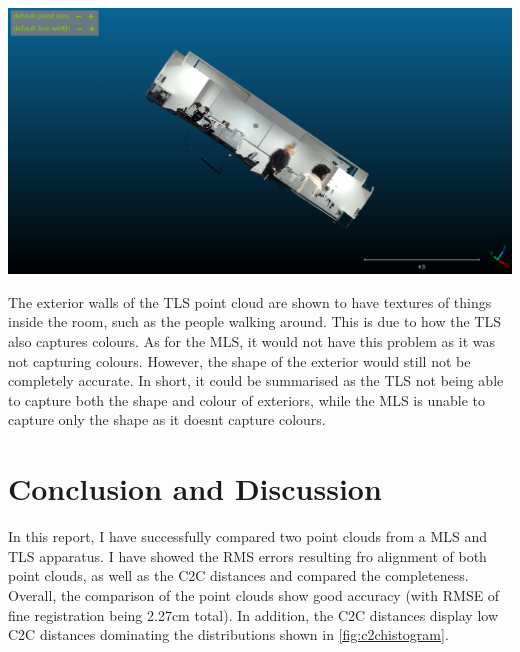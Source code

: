 \documentclass[man]{apa7}
\begin{document}
\begin{minipage}{\linewidth}
  \includegraphics[height=\textheight/4 ,width=\textwidth/2]{figures/exteriorTLS.png}
  \label{fig:exteriorArea}
\end{minipage}

The exterior walls of the TLS point cloud are shown to have textures of things inside the room, such as the people walking around. This is due to how the TLS also captures colours. As for the MLS, it would not have this problem as it was not capturing colours. However, the shape of the exterior would still not be completely accurate. In short, it could be summarised as the TLS not being able to capture both the shape and colour of exteriors, while the MLS is unable to capture only the shape as it doesnt capture colours.

\newpage

\section{Conclusion and Discussion}

In this report, I have successfully compared two point clouds from a MLS and TLS apparatus. I have showed the RMS errors resulting fro alignment of both point clouds, as well as the C2C distances and compared the completeness. Overall, the comparison of the point clouds show good accuracy (with RMSE of fine registration being 2.27cm total). In addition, the C2C distances display low C2C distances dominating the distributions shown in \ref{fig:c2chistogram}. 
\end{document}
